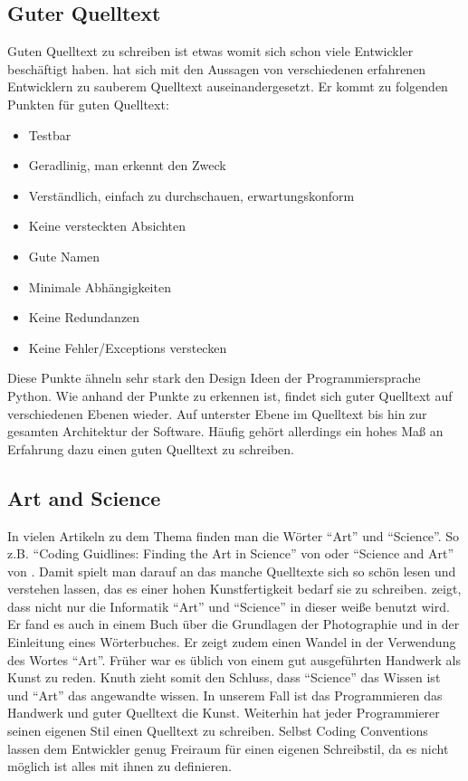 \subsection{Guter Quelltext}

Guten Quelltext zu schreiben ist etwas womit sich schon viele Entwickler beschäftigt haben\cite{Martin, Green, Spinellis, reed}.
\cite[S. 32f.]{Martin} hat sich mit den Aussagen von verschiedenen erfahrenen Entwicklern zu sauberem Quelltext auseinandergesetzt.
Er kommt zu folgenden Punkten für guten Quelltext:

\begin{itemize}
\item Testbar
\item Geradlinig, man erkennt den Zweck
\item Verständlich, einfach zu durchschauen, erwartungskonform
\item Keine versteckten Absichten
\item Gute Namen
\item Minimale Abhängigkeiten
\item Keine Redundanzen
\item Keine Fehler/Exceptions verstecken
\end{itemize}

Diese Punkte ähneln sehr stark den Design Ideen der Programmiersprache Python\cite{Peters}.
Wie anhand der Punkte zu erkennen ist, findet sich guter Quelltext auf verschiedenen Ebenen wieder. Auf unterster Ebene im Quelltext bis hin zur gesamten Architektur der Software. Häufig gehört allerdings ein hohes Maß an Erfahrung dazu einen guten Quelltext zu schreiben.


\subsection{Art and Science}

In vielen Artikeln zu dem Thema finden man die Wörter \enquote{Art} und \enquote{Science}. So z.B.
\enquote{Coding Guidlines: Finding the Art in Science} von \cite{Green} oder \enquote{Science and Art} von \cite[S. 669]{Knuth}.
Damit spielt man darauf an das manche Quelltexte sich so schön lesen und verstehen lassen, das es einer hohen Kunstfertigkeit bedarf sie zu schreiben. \cite[S. 669]{Knuth} zeigt, dass nicht nur die Informatik \enquote{Art} und \enquote{Science} in dieser weiße benutzt wird. Er fand es auch in einem Buch über die Grundlagen der Photographie und in der Einleitung eines Wörterbuches\cite[S. 669]{Knuth}.
Er zeigt zudem einen Wandel in der Verwendung des Wortes \enquote{Art}.
Früher war es üblich von einem gut ausgeführten Handwerk als Kunst zu reden.
Knuth zieht somit den Schluss, dass \enquote{Science} das Wissen ist und \enquote{Art} das angewandte wissen.
In unserem Fall ist das Programmieren das Handwerk und guter Quelltext die Kunst.
Weiterhin hat jeder Programmierer seinen eigenen Stil einen Quelltext zu schreiben.
Selbst Coding Conventions lassen dem Entwickler genug Freiraum für einen eigenen Schreibstil, da es nicht möglich ist alles mit ihnen zu definieren.


